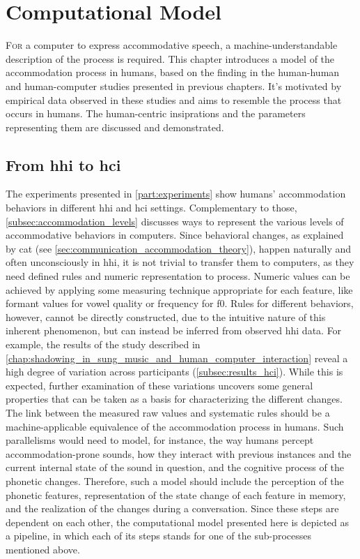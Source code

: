 \chapter[Computational Model]{Computational Model}
\label{chap:computational_model}

\lettrine{F}{or} a computer to express accommodative speech, a machine-understandable description of the process is required.
This chapter introduces a model of the accommodation process in humans, based on the finding in the human-human and human-computer studies presented in previous chapters.
It's motivated by empirical data observed in these studies and aims to resemble the process that occurs in humans.
The human-centric insiprations and the parameters representing them are discussed and demonstrated.

\pagebreak

\acresetall

\section{From \acs{hhi} to \acs{hci}}
\label{sec:from_hhi_to_hci}

The experiments presented in \cref{part:experiments} show humans' accommodation behaviors in different \acf{hhi} and \acf{hci} settings.
Complementary to those, \cref{subsec:accommodation_levels} discusses ways to represent the various levels of accommodative behaviors in computers.
Since behavioral changes, as explained by \ac{cat} (see \cref{sec:communication_accommodation_theory}), happen naturally and often unconsciously in \ac{hhi}, it is not trivial to transfer them to computers, as they need defined rules and numeric representation to process.
Numeric values can be achieved by applying some measuring technique appropriate for each feature, like formant values for vowel quality or frequency for \ac{f0}.
Rules for different behaviors, however, cannot be directly constructed, due to the intuitive nature of this inherent phenomenon, but can instead be inferred from observed \ac{hhi} data.
For example, the results of the study described in \cref{chap:shadowing_in_sung_music_and_human_computer_interaction} reveal a high degree of variation across participants (\cref{subsec:results_hci}).
While this is expected, further examination of these variations uncovers some general properties that can be taken as a basis for characterizing the different changes.
The link between the measured raw values and systematic rules should be a machine-applicable equivalence of the accommodation process in humans.
Such parallelisms would need to model, for instance, the way humans percept accommodation-prone sounds, how they interact with previous instances and the current internal state of the sound in question, and the cognitive process of the phonetic changes.
Therefore, such a model should include the perception of the phonetic features, representation of the state change of each feature in memory, and the realization of the changes during a conversation.
Since these steps are dependent on each other, the computational model presented here is depicted as a pipeline, in which each of its steps stands for one of the sub-processes mentioned above.

